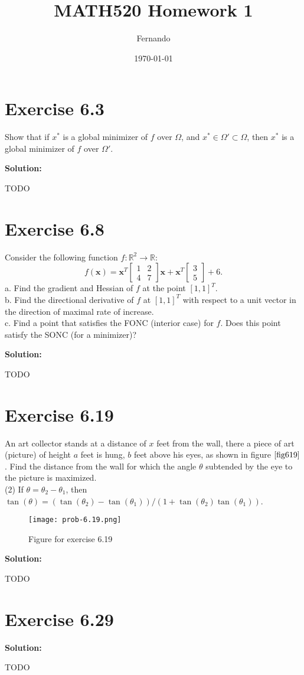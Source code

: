 \documentclass{article}
\newcommand{\bld}[1]{\boldsymbol{#1}}
\begin{document}
\title{MATH520 Homework 1}
\author{Fernando}
\date{\today}
\maketitle

\section*{Exercise 6.3}
Show that if $x^*$ is a global minimizer of $f$ over $\Omega$, and
$x^*\in\Omega'\subset \Omega$, then $x^*$ is a global minimizer of $f$ over
$\Omega'$.

\textbf{Solution:}

TODO
\section*{Exercise 6.8}
Consider the following function $f:\mathbb{R}^2 \to \mathbb{R}$:
\[
	f(\bld{x})=\bld{x}^T
	\begin{bmatrix}
	1 & 2\\
	4 & 7
	\end{bmatrix}
	\bld{x} + \bld{x}^T
	\begin{bmatrix}
	3\\
	5
	\end{bmatrix}
	+ 6.
\]
a. Find the gradient and Hessian of $f$ at the point $[1,1]^T$.\\
b. Find the directional derivative of $f$ at $[1,1]^T$ with respect to a unit
vector in the direction of maximal rate of increase.\\
c. Find a point that satisfies the FONC (interior case) for $f$. Does this
point satisfy the SONC (for a minimizer)?

\textbf{Solution:}

TODO
\section*{Exercise 6.19}
An art collector stands at a distance of $x$ feet from the wall, there a piece
of art (picture) of height $a$ feet is hung, $b$ feet above his eyes, as shown
in figure $\ref{fig619}$. Find the distance from the wall for which the angle $\theta$
subtended by the eye to the picture is maximized.\\
(2) If $\theta = \theta_2 - \theta_1$, then
$\tan(\theta)=(\tan(\theta_2)-\tan(\theta_1))/(1+\tan(\theta_2)\tan(\theta_1))$.
\begin{figure}[ht]
	\center
	\caption{Figure for exercise 6.19}
	\texttt{[image: prob-6.19.png]}
	\label{fig619}
\end{figure}

\textbf{Solution:}

TODO
\section*{Exercise 6.29}

\textbf{Solution:}

TODO
\end{document}
